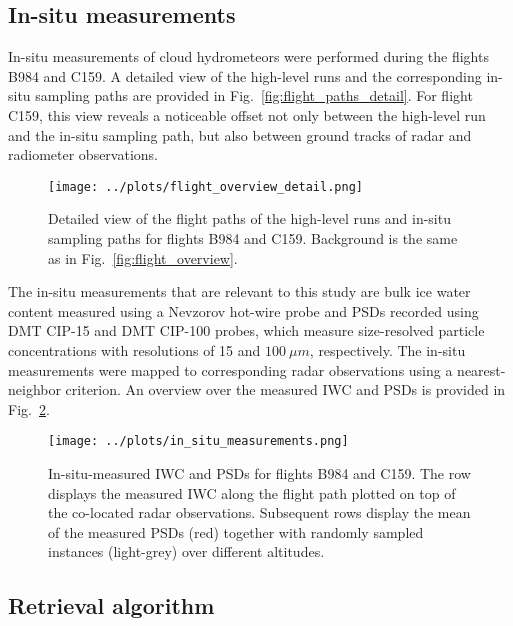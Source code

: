 \documentclass[journal abbreviation, manuscript]{copernicus}
\begin{document}
\subsection{In-situ measurements}
\label{sec:in_situ}

In-situ measurements of cloud hydrometeors were performed during  the flights
B984 and C159. A detailed view of the high-level runs and the corresponding
in-situ sampling paths are provided in Fig.~\ref{fig:flight_paths_detail}.
For flight C159, this view  reveals a noticeable offset not only between the
high-level run and the in-situ sampling path, but also between ground tracks
of radar and radiometer observations.

\begin{figure}[h!]
  \centering
  \texttt{[image: ../plots/flight\_overview\_detail.png]}
  \caption{
    Detailed view of the flight paths of the high-level runs and in-situ sampling
    paths for flights B984 and C159. Background is the same as in
    Fig.~\ref{fig:flight_overview}.
    }
  \label{fig:flight_oberview_detail}
\end{figure}

The in-situ measurements that are relevant to this study are bulk ice water
content measured using a Nevzorov hot-wire probe \citep{korolev13} and PSDs
recorded using DMT CIP-15 and DMT CIP-100 probes, which measure size-resolved
particle concentrations with resolutions of 15 and $100\ \unit{\mu m}$,
respectively. The in-situ measurements were mapped to corresponding radar
observations using a nearest-neighbor criterion. An overview over the measured
IWC and PSDs is provided in Fig.~\ref{fig:in_situ}.

\begin{figure}[hbpt!]
  \centering
  \texttt{[image: ../plots/in\_situ\_measurements.png]}
  \caption{
    In-situ-measured IWC and PSDs for flights B984 and C159. The row displays
    the measured IWC along the flight path plotted on top of the co-located radar
    observations. Subsequent rows display the mean of the measured PSDs (red)
    together with randomly sampled instances (light-grey) over different
    altitudes.
    }
  \label{fig:in_situ}
\end{figure}

\subsection{Retrieval algorithm}
\label{sec:synergistic_retrieval}
\end{document}
